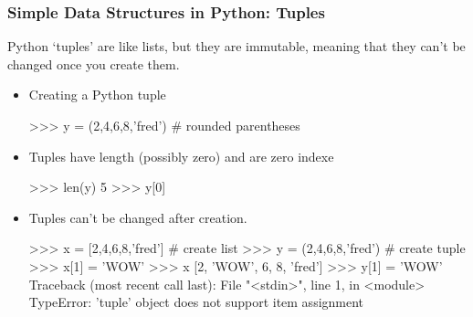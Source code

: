 \documentclass{beamer}
\begin{document}
\begin{frame}[fragile]
  \frametitle{Simple Data Structures in Python: Tuples}

Python `tuples' are like lists, but they are immutable, meaning that they can't be changed once you create them.

\begin{itemize}
	\item Creating a Python tuple
\begin{Pcode}	
>>> y = (2,4,6,8,'fred') # rounded parentheses
\end{Pcode}

	\item Tuples have length (possibly zero) and are zero indexe
\begin{Pcode}	
>>> len(y)
5
>>> y[0]
\end{Pcode}

\item Tuples can't be changed after creation.

\begin{Pcode}
>>> x = [2,4,6,8,'fred'] # create list
>>> y = (2,4,6,8,'fred') # create tuple
>>> x[1] = 'WOW'
>>> x
[2, 'WOW', 6, 8, 'fred']
>>> y[1] = 'WOW'
Traceback (most recent call last):
  File "<stdin>", line 1, in <module>
TypeError: 'tuple' object does not support item assignment    
\end{Pcode}

\end{itemize}

\end{frame}
\end{document}
